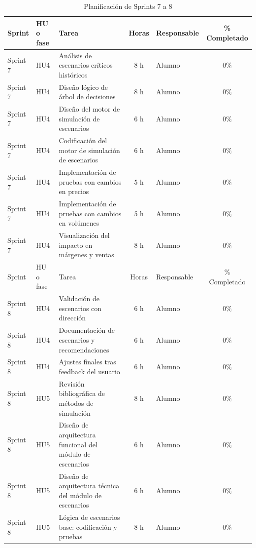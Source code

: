 \documentclass[
11pt, %
]{charter}
\begin{document}
\begin{table}[htpb]
\centering
\caption{Planificación de Sprints 7 a 8}
\begin{tabularx}{\linewidth}{@{}|l|l|X|c|l|c|@{}}
\hline
\rowcolor[HTML]{C0C0C0}
Sprint & HU o fase & Tarea & Horas & Responsable & \% Completado \\ \hline
Sprint 7 & HU4 & Análisis de escenarios críticos históricos & 8 h & Alumno & 0\% \\ \hline
Sprint 7 & HU4 & Diseño lógico de árbol de decisiones & 8 h & Alumno & 0\% \\ \hline
Sprint 7 & HU4 & Diseño del motor de simulación de escenarios & 6 h & Alumno & 0\% \\ \hline
Sprint 7 & HU4 & Codificación del motor de simulación de escenarios & 6 h & Alumno & 0\% \\ \hline
Sprint 7 & HU4 & Implementación de pruebas con cambios en precios & 5 h & Alumno & 0\% \\ \hline
Sprint 7 & HU4 & Implementación de pruebas con cambios en volúmenes & 5 h & Alumno & 0\% \\ \hline
Sprint 7 & HU4 & Visualización del impacto en márgenes y ventas & 8 h & Alumno & 0\% \\ \hline
\hline
Sprint & HU o fase & Tarea & Horas & Responsable & \% Completado \\ \hline
Sprint 8 & HU4 & Validación de escenarios con dirección & 6 h & Alumno & 0\% \\ \hline
Sprint 8 & HU4 & Documentación de escenarios y recomendaciones & 6 h & Alumno & 0\% \\ \hline
Sprint 8 & HU4 & Ajustes finales tras feedback del usuario & 6 h & Alumno & 0\% \\ \hline
Sprint 8 & HU5 & Revisión bibliográfica de métodos de simulación & 8 h & Alumno & 0\% \\ \hline
Sprint 8 & HU5 & Diseño de arquitectura funcional del módulo de escenarios & 6 h & Alumno & 0\% \\ \hline
Sprint 8 & HU5 & Diseño de arquitectura técnica del módulo de escenarios & 6 h & Alumno & 0\% \\ \hline
Sprint 8 & HU5 & Lógica de escenarios base: codificación y pruebas & 8 h & Alumno & 0\% \\ \hline
\end{tabularx}
\end{table}
\end{document}
